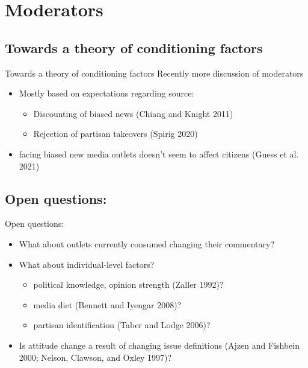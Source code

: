 \documentclass[
  ignorenonframetext,
]{beamer}
\providecommand{\tightlist}{%
  \setlength{\itemsep}{0pt}\setlength{\parskip}{0pt}}
\begin{document}
\hypertarget{moderators}{%
\section{Moderators}\label{moderators}}

\hypertarget{towards-a-theory-of-conditioning-factors}{%
\subsection{Towards a theory of conditioning
factors}\label{towards-a-theory-of-conditioning-factors}}

\begin{frame}{Towards a theory of conditioning factors}
Recently more discussion of moderators

\begin{itemize}
\tightlist
\item
  Mostly based on expectations regarding source:

  \begin{itemize}
  \tightlist
  \item
    Discounting of biased news (Chiang and Knight 2011)
  \item
    Rejection of partisan takeovers (Spirig 2020)
  \end{itemize}
\item
  facing biased new media outlets doesn't seem to affect citizens (Guess
  et al. 2021)
\end{itemize}
\end{frame}

\hypertarget{open-questions}{%
\subsection{Open questions:}\label{open-questions}}

\begin{frame}{Open questions:}
\begin{itemize}
\tightlist
\item
  What about outlets currently consumed changing their commentary?
\item
  What about individual-level factors?

  \begin{itemize}
  \tightlist
  \item
    political knowledge, opinion strength (Zaller 1992)?
  \item
    media diet (Bennett and Iyengar 2008)?
  \item
    partisan identification (Taber and Lodge 2006)?
  \end{itemize}
\item
  Is attitude change a result of changing issue definitions (Ajzen and
  Fishbein 2000; Nelson, Clawson, and Oxley 1997)?
\end{itemize}
\end{frame}
\end{document}
